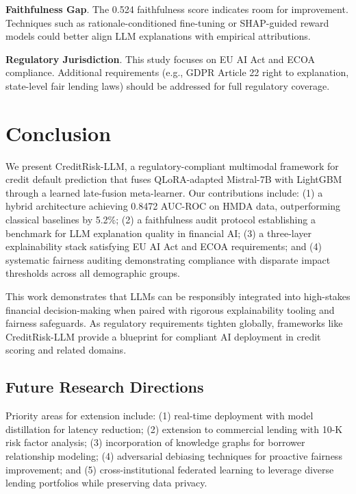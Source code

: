 \documentclass[11pt,a4paper]{article}
\begin{document}
\textbf{Faithfulness Gap}. The 0.524 faithfulness score indicates room for improvement. Techniques such as rationale-conditioned fine-tuning or SHAP-guided reward models could better align LLM explanations with empirical attributions.

\textbf{Regulatory Jurisdiction}. This study focuses on EU AI Act and ECOA compliance. Additional requirements (e.g., GDPR Article 22 right to explanation, state-level fair lending laws) should be addressed for full regulatory coverage.

\section{Conclusion}\label{sec:conclusion}

We present CreditRisk-LLM, a regulatory-compliant multimodal framework for credit default prediction that fuses QLoRA-adapted Mistral-7B with LightGBM through a learned late-fusion meta-learner. Our contributions include: (1) a hybrid architecture achieving 0.8472 AUC-ROC on HMDA data, outperforming classical baselines by 5.2\%; (2) a faithfulness audit protocol establishing a benchmark for LLM explanation quality in financial AI; (3) a three-layer explainability stack satisfying EU AI Act and ECOA requirements; and (4) systematic fairness auditing demonstrating compliance with disparate impact thresholds across all demographic groups.

This work demonstrates that LLMs can be responsibly integrated into high-stakes financial decision-making when paired with rigorous explainability tooling and fairness safeguards. As regulatory requirements tighten globally, frameworks like CreditRisk-LLM provide a blueprint for compliant AI deployment in credit scoring and related domains.

\subsection*{Future Research Directions}

Priority areas for extension include: (1) real-time deployment with model distillation for latency reduction; (2) extension to commercial lending with 10-K risk factor analysis; (3) incorporation of knowledge graphs for borrower relationship modeling; (4) adversarial debiasing techniques for proactive fairness improvement; and (5) cross-institutional federated learning to leverage diverse lending portfolios while preserving data privacy.
\end{document}
